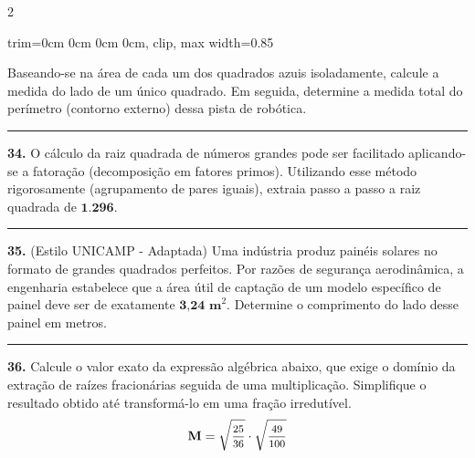 \documentclass[twoside, 10pt, a4paper]{article}
\newlength{\espacoPreQuestao}\setlength{\espacoPreQuestao}{0.1cm}
\newlength{\espacoQuestao}\setlength{\espacoQuestao}{0.2cm}
\newcommand{\larguraTikz}{0.85\linewidth}
\begin{document}
\begin{multicols*}{2}
\begin{center}
\begin{adjustbox}{trim=0cm 0cm 0cm 0cm, clip, max width=\larguraTikz}
\end{adjustbox}
\end{center}
Baseando-se na área de cada um dos quadrados azuis isoladamente, calcule a medida do lado de um único quadrado. Em seguida, determine a medida total do perímetro (contorno externo) dessa pista de robótica.
\par\vspace{\espacoQuestao}

\noindent\textcolor{CorLinha}{\rule{\linewidth}{0.5pt}} 
\par\vspace{\espacoPreQuestao}
\textbf{34.} O cálculo da raiz quadrada de números grandes pode ser facilitado aplicando-se a fatoração (decomposição em fatores primos). Utilizando esse método rigorosamente (agrupamento de pares iguais), extraia passo a passo a raiz quadrada de $ \textbf{1.296} $.
\par\vspace{\espacoQuestao}
\noindent\textcolor{CorLinha}{\rule{\linewidth}{0.5pt}} 
\par\vspace{\espacoPreQuestao}
\textbf{35.} (Estilo UNICAMP - Adaptada) Uma indústria produz painéis solares no formato de grandes quadrados perfeitos. Por razões de segurança aerodinâmica, a engenharia estabelece que a área útil de captação de um modelo específico de painel deve ser de exatamente $ \textbf{3,24 m}^{2} $. Determine o comprimento do lado desse painel em metros.
\par\vspace{\espacoQuestao}

\noindent\textcolor{CorLinha}{\rule{\linewidth}{0.5pt}} 
\par\vspace{\espacoPreQuestao}
\textbf{36.} Calcule o valor exato da expressão algébrica abaixo, que exige o domínio da extração de raízes fracionárias seguida de uma multiplicação. Simplifique o resultado obtido até transformá-lo em uma fração irredutível.
$$ \textbf{M} = \sqrt{\mfrac{25}{36}} \cdot \sqrt{\mfrac{49}{100}} $$
\par\vspace{\espacoQuestao}


\end{multicols*}
\end{document}
